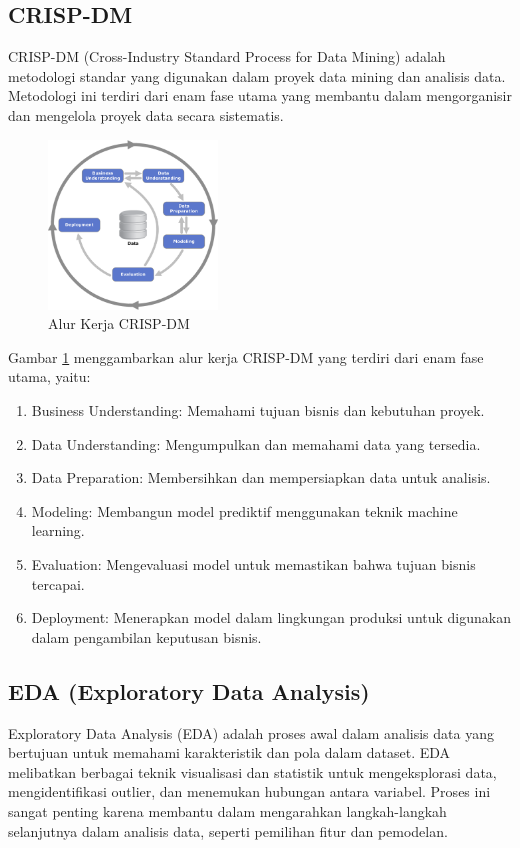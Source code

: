 \subsection{CRISP-DM}
CRISP-DM (Cross-Industry Standard Process for Data Mining) adalah metodologi standar yang digunakan dalam proyek data mining dan analisis data. Metodologi ini terdiri dari enam fase utama yang membantu dalam mengorganisir dan mengelola proyek data secara sistematis. \parencite{chumbar2020crispdm}

\begin{figure}[H]
    \centering
    \includegraphics[width=0.4\textwidth]{Gambar/CRISP-DM.png}
    \caption{Alur Kerja CRISP-DM}
    \label{fig:crisp-dm}
\end{figure}

Gambar \ref{fig:crisp-dm} menggambarkan alur kerja CRISP-DM yang terdiri dari enam fase utama, yaitu:
\begin{enumerate}
    \item Business Understanding: Memahami tujuan bisnis dan kebutuhan proyek.
    \item Data Understanding: Mengumpulkan dan memahami data yang tersedia.
    \item Data Preparation: Membersihkan dan mempersiapkan data untuk analisis.
    \item Modeling: Membangun model prediktif menggunakan teknik machine learning.
    \item Evaluation: Mengevaluasi model untuk memastikan bahwa tujuan bisnis tercapai.
    \item Deployment: Menerapkan model dalam lingkungan produksi untuk digunakan dalam pengambilan keputusan bisnis.
\end{enumerate}

\subsection{EDA (Exploratory Data Analysis)}
Exploratory Data Analysis (EDA) adalah proses awal dalam analisis data yang bertujuan untuk memahami karakteristik dan pola dalam dataset. EDA melibatkan berbagai teknik visualisasi dan statistik untuk mengeksplorasi data, mengidentifikasi outlier, dan menemukan hubungan antara variabel. Proses ini sangat penting karena membantu dalam mengarahkan langkah-langkah selanjutnya dalam analisis data, seperti pemilihan fitur dan pemodelan. \parencite{tukey1977exploratory}

